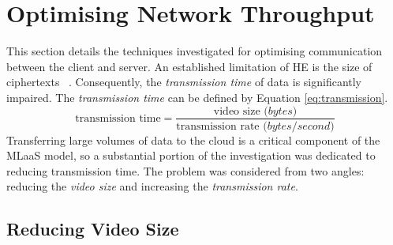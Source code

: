 \section{Optimising Network Throughput}
\label{sec:networking}
\indent \indent
This section details the techniques investigated for optimising communication between the client and server. An established limitation of HE is the size of ciphertexts ~\cite{Makkaoui}. Consequently, the \textit{transmission time} of data is significantly impaired. The \textit{transmission time} can be defined by Equation \ref{eq:transmission}.
\begin{equation}
    \text{transmission time} = \frac{\text{video size }\textit{(bytes)}}{\text{transmission rate }\textit{(bytes/second)}}
    \label{eq:transmission}
\end{equation}
\indent \indent
Transferring large volumes of data to the cloud is a critical component of the MLaaS model, so a substantial portion of the investigation was dedicated to reducing transmission time. The problem was considered from two angles: reducing the \textit{video size} and increasing the \textit{transmission rate}.
\subsection{Reducing Video Size}
